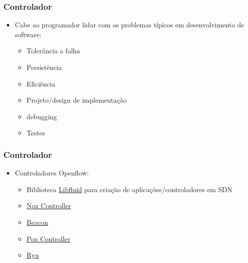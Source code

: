%
%
\begin{frame}\frametitle{Controlador}

    \begin{itemize}
    \item Cabe ao programador lidar com os problemas típicos em 
          desenvolvimento de software:
          \begin{itemize}
          \item Tolerância a falha
          \item Persistência
          \item Eficiência
          \item Projeto/design de implementação
          \item debugging
          \item Testes
          \end{itemize}
    \end{itemize}
\end{frame}


%
%
\begin{frame}\frametitle{Controlador}

    \begin{itemize}
    \item Controladores Openflow:
          \begin{itemize}
          \item Biblioteca \href{http://opennetworkingfoundation.github.io/libfluid/index.html}{Libfluid}
                para criação de aplicações/controladores em SDN
          \item \href{http://www.noxrepo.org/nox/about-nox/}{Nox Controller}
          \item \href{https://openflow.stanford.edu/display/Beacon/Home}{Beacon}
          \item \href{http://www.noxrepo.org/pox/about-pox/}{Pox Controller}
          \item \href{http://osrg.github.io/ryu/}{Ryu}
          \end{itemize}
    \end{itemize}
\end{frame}
